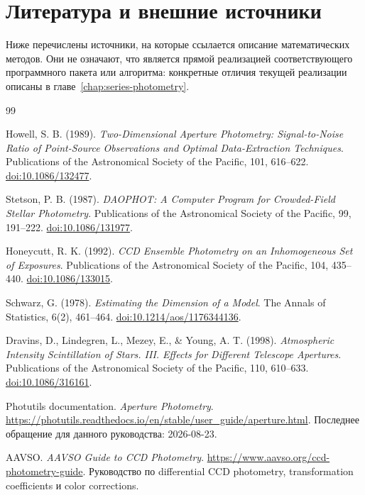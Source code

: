 \chapter{Литература и внешние источники}
\label{app:references}

Ниже перечислены источники, на которые ссылается описание математических методов. Они не означают, что \program{} является прямой реализацией соответствующего программного пакета или алгоритма: конкретные отличия текущей реализации описаны в главе~\ref{chap:series-photometry}.

\begin{thebibliography}{99}

Howell, S. B. (1989).
\textit{Two-Dimensional Aperture Photometry: Signal-to-Noise Ratio of Point-Source Observations and Optimal Data-Extraction Techniques}.
Publications of the Astronomical Society of the Pacific, 101, 616--622.
\href{https://doi.org/10.1086/132477}{doi:10.1086/132477}.

Stetson, P. B. (1987).
\textit{DAOPHOT: A Computer Program for Crowded-Field Stellar Photometry}.
Publications of the Astronomical Society of the Pacific, 99, 191--222.
\href{https://doi.org/10.1086/131977}{doi:10.1086/131977}.

Honeycutt, R. K. (1992).
\textit{CCD Ensemble Photometry on an Inhomogeneous Set of Exposures}.
Publications of the Astronomical Society of the Pacific, 104, 435--440.
\href{https://doi.org/10.1086/133015}{doi:10.1086/133015}.

Schwarz, G. (1978).
\textit{Estimating the Dimension of a Model}.
The Annals of Statistics, 6(2), 461--464.
\href{https://doi.org/10.1214/aos/1176344136}{doi:10.1214/aos/1176344136}.

Dravins, D., Lindegren, L., Mezey, E., \& Young, A. T. (1998).
\textit{Atmospheric Intensity Scintillation of Stars. III. Effects for Different Telescope Apertures}.
Publications of the Astronomical Society of the Pacific, 110, 610--633.
\href{https://doi.org/10.1086/316161}{doi:10.1086/316161}.

Photutils documentation.
\textit{Aperture Photometry}.
\url{https://photutils.readthedocs.io/en/stable/user_guide/aperture.html}.
Последнее обращение для данного руководства: 2026-08-23.

AAVSO.
\textit{AAVSO Guide to CCD Photometry}.
\url{https://www.aavso.org/ccd-photometry-guide}.
Руководство по differential CCD photometry, transformation coefficients и color corrections.

\end{thebibliography}
